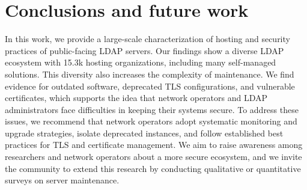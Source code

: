 \section{Conclusions and future work}
In this work, we provide a large-scale characterization of hosting and security practices of public-facing \gls{LDAP} servers. 
Our findings show a diverse \gls{LDAP} ecosystem with 15.3k hosting organizations, including many self-managed solutions. This diversity also increases the complexity of maintenance. We find evidence for outdated software, deprecated \gls{TLS} configurations, and vulnerable certificates, which supports the idea that network operators and \gls{LDAP} administrators face difficulties in keeping their systems secure.
To address these issues, we recommend that network operators adopt systematic monitoring and upgrade strategies, isolate deprecated instances, and follow established best practices for \gls{TLS} and certificate management.
We aim to raise awareness among researchers and network operators about a more secure ecosystem, and we invite the community to extend this research by conducting qualitative or quantitative surveys on server maintenance.

